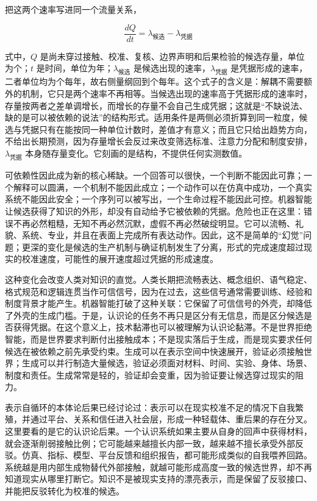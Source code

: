 把这两个速率写进同一个流量关系，

\begin{equation}
\frac{dQ}{dt}=\lambda_{\text{候选}}-\lambda_{\text{凭据}}
\end{equation}

式中，$Q$ 是尚未穿过接触、校准、复核、边界声明和后果检验的候选存量，单位为个；$t$ 是时间，单位为年；$\lambda_{\text{候选}}$ 是候选出现的速率，$\lambda_{\text{凭据}}$ 是凭据形成的速率，二者单位均为个每年，故右侧量纲回到个每年。这个式子的含义是：解耦不需要额外的机制，它只是两个速率不再相等。当候选出现的速率高于凭据形成的速率时，存量按两者之差单调增长，而增长的存量不会自己生成凭据；这就是“不缺说法、缺的是可以被依赖的说法”的结构形式。适用条件是两侧必须折算到同一粒度，候选与凭据只有在能按同一种单位计数时，差值才有意义；而且它只给出趋势方向，不给出长期预测，因为存量增长会反过来改变筛选标准、注意力分配和制度安排，$\lambda_{\text{凭据}}$ 本身随存量变化。它刻画的是结构，不提供任何实测数值。


可依赖性因此成为新的核心稀缺。一个回答可以很快，一个判断不能因此可靠；一个解释可以圆满，一个机制不能因此成立；一个动作可以在仿真中成功，一个真实系统不能因此安全；一个序列可以被写出，一个生命过程不能因此可控。机器智能让候选获得了知识的外形，却没有自动给予它被依赖的凭据。危险也正在这里：错误不再必然粗糙，无知不再必然沉默，虚假不再必然破绽明显。它可以流畅、礼貌、系统、专业，并且在表面上完成所有表达动作。因此，这不是简单的“幻觉”问题；更深的变化是候选的生产机制与确证机制发生了分离，形式的完成速度超过现实的校准速度，可能性的展开速度超过凭据的形成速度。

这种变化会改变人类对知识的直觉。人类长期把流畅表达、概念组织、语气稳定、格式规范和逻辑连贯当作可信信号，因为在过去，这些信号通常需要训练、经验和制度背景才能产生。机器智能打破了这种关联：它保留了可信信号的外壳，却降低了外壳的生成门槛。于是，认识论的任务不再只是区分有无信息，而是区分候选是否获得凭据。在这个意义上，技术黏滞也可以被理解为认识论黏滞。不是世界拒绝智能，而是世界要求判断付出接触成本；不是现实落后于生成，而是现实要求任何候选在被依赖之前先承受约束。生成可以在表示空间中快速展开，验证必须接触世界；生成可以并行制造大量候选，验证必须面对材料、时间、实验、身体、场景、制度和责任。生成常常是轻的，验证却会变重，因为验证要让候选穿过现实的阻力。

表示自循环的本体论后果已经讨论过：表示可以在现实校准不足的情况下自我繁殖，并通过平台、关系和信任进入社会层，形成一种轻载体、重后果的存在分叉。这里要看的是它的认识论后果。一个认识系统如果主要从自身的回声中获得材料，就会逐渐削弱接触比例；它可能越来越擅长内部一致，越来越不擅长承受外部反驳。仿真、指标、模型、平台反馈和组织报告，都可能形成类似的自我喂养回路\cite{cinelli2021echo}。系统越是用内部生成物替代外部接触，就越可能形成高度一致的候选世界，却不再知道现实从哪里打断它。知识不是被现实支持的漂亮表示，而是保留了反驳接口、并能把反驳转化为校准的候选。

